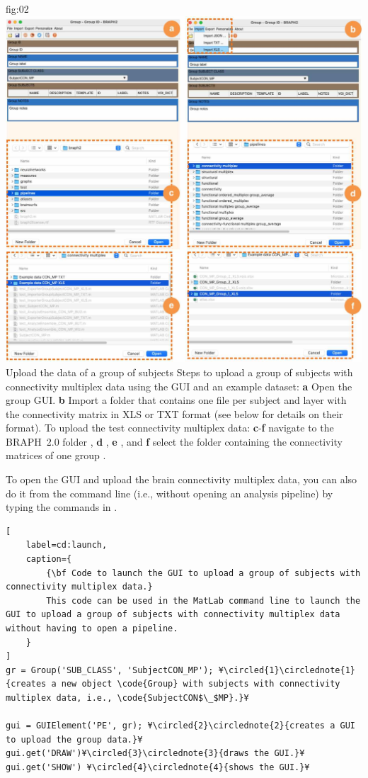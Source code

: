 \documentclass[justified]{tufte-handout}
\begin{document}
	{fig:02}
	{
	\includegraphics{fig02.jpg}
	}
	{Upload the data of a group of subjects}
	{
	Steps to upload a group of subjects with connectivity multiplex data using the GUI and an example dataset: 
	{\bf a} Open the group GUI.
	{\bf b} Import a folder that contains one file per subject and layer with the connectivity matrix in XLS or TXT format (see below for details on their format).
	To upload the test connectivity multiplex data:
	{\bf c}-{\bf f} navigate to the BRAPH~2.0 folder , {\bf d} ,  {\bf e} , and {\bf f} select the folder containing the connectivity matrices of one group .
	}
 
To open the GUI and upload the brain connectivity multiplex data, you can also do it from the command line (i.e., without opening an analysis pipeline) by typing the commands in . 
%
\begin{lstlisting}[
	label=cd:launch,
	caption={
		{\bf Code to launch the GUI to upload a group of subjects with connectivity multiplex data.}
		This code can be used in the MatLab command line to launch the GUI to upload a group of subjects with connectivity multiplex data without having to open a pipeline.
	}
]
gr = Group('SUB_CLASS', 'SubjectCON_MP'); ¥\circled{1}\circlednote{1}{creates a new object \code{Group} with subjects with connectivity multiplex data, i.e., \code{SubjectCON$\_$MP}.}¥

gui = GUIElement('PE', gr); ¥\circled{2}\circlednote{2}{creates a GUI to upload the group data.}¥
gui.get('DRAW')¥\circled{3}\circlednote{3}{draws the GUI.}¥
gui.get('SHOW') ¥\circled{4}\circlednote{4}{shows the GUI.}¥
\end{lstlisting}
\end{document}
